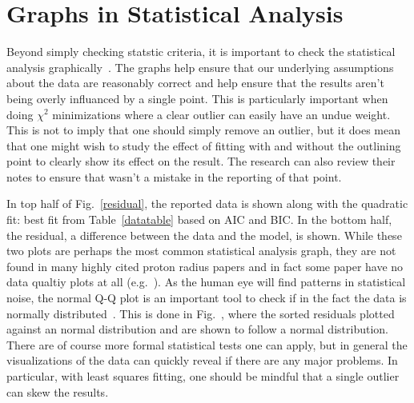 \documentclass[10pt,aps,prc,twocolumn]{revtex4-1}
\begin{document}
\section{Graphs in Statistical Analysis}

Beyond simply checking statstic criteria, it is important to check the statistical analysis graphically~\cite{Anscombe:1973}.
The graphs help ensure that our underlying assumptions about the data are reasonably correct and help ensure that the results
aren't being overly influanced by a single point.   This is particularly important when doing $\chi^2$ minimizations where a
clear outlier can easily have an undue weight.    This is not to imply that one should simply remove an outlier, but it does
mean that one might wish to study the effect of fitting with and without the outlining point to clearly show its effect on 
the result.   The research can also review their notes to ensure that wasn't a mistake in the reporting of that point.

In top half of Fig.~\ref{residual}, the reported data is shown along with the quadratic fit:  best fit from Table~\ref{datatable} based
on AIC and BIC.   In the bottom half, the residual, a difference between the data and the model, is shown.     While these two plots
are perhaps the most common statistical analysis graph, they are not found in many highly cited proton radius papers and in fact some
paper  have no data qualtiy plots at all (e.g.~\cite{Rosenfelder:1999cd}).
As the human eye will find patterns in statistical noise, the normal Q-Q plot is an important tool to check if in the fact the 
data is normally distributed~\cite{Wilk:1968}.   This is done in Fig.~\cite{normqq}, where the sorted residuals plotted against an normal distribution
and are shown to follow a normal distribution.   There are of course more formal statistical tests one can apply, but in general the
visualizations of the data can quickly reveal if there are any major problems.   In particular, with least squares fitting, one should
be mindful that a single outlier can skew the results.
\end{document}
